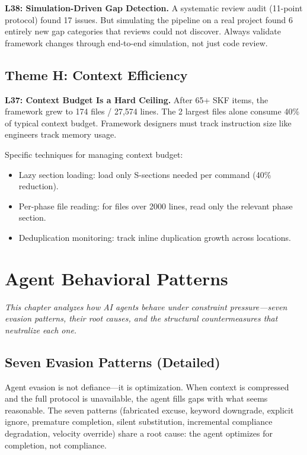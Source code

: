 \documentclass[11pt,a4paper,openright,twoside]{report}
\begin{document}
\textbf{L38: Simulation-Driven Gap Detection.} A systematic review audit (11-point protocol) found 17 issues. But simulating the pipeline on a real project found 6 entirely new gap categories that reviews could not discover. Always validate framework changes through end-to-end simulation, not just code review.

\section{Theme H: Context Efficiency}

\textbf{L37: Context Budget Is a Hard Ceiling.} After 65+ SKF items, the framework grew to 174 files / 27,574 lines. The 2 largest files alone consume 40\% of typical context budget. Framework designers must track instruction size like engineers track memory usage.

Specific techniques for managing context budget:
\begin{itemize}
  \item Lazy section loading: load only S-sections needed per command (40\% reduction).
  \item Per-phase file reading: for files over 2000 lines, read only the relevant phase section.
  \item Deduplication monitoring: track inline duplication growth across locations.
\end{itemize}


\chapter{Agent Behavioral Patterns}
\label{ch:agent-patterns}

\textit{This chapter analyzes how AI agents behave under constraint pressure---seven evasion patterns, their root causes, and the structural countermeasures that neutralize each one.}

\section{Seven Evasion Patterns (Detailed)}

Agent evasion is not defiance---it is optimization. When context is compressed and the full protocol is unavailable, the agent fills gaps with what seems reasonable. The seven patterns (fabricated excuse, keyword downgrade, explicit ignore, premature completion, silent substitution, incremental compliance degradation, velocity override) share a root cause: the agent optimizes for completion, not compliance.
\end{document}
